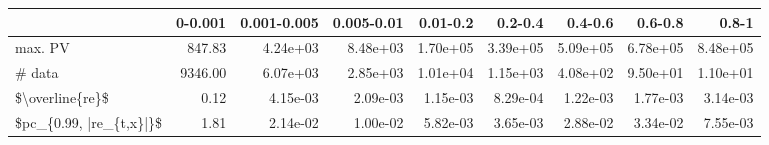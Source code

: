 \begin{tabular}{lrrrrrrrr}
\toprule
{} &  0-0.001 &  0.001-0.005 &  0.005-0.01 &  0.01-0.2 &   0.2-0.4 &   0.4-0.6 &   0.6-0.8 &     0.8-1 \\
\midrule
max. PV                 &   847.83 &     4.24e+03 &    8.48e+03 &  1.70e+05 &  3.39e+05 &  5.09e+05 &  6.78e+05 &  8.48e+05 \\
\# data                  &  9346.00 &     6.07e+03 &    2.85e+03 &  1.01e+04 &  1.15e+03 &  4.08e+02 &  9.50e+01 &  1.10e+01 \\
\$\textbackslash overline\{re\}\$         &     0.12 &     4.15e-03 &    2.09e-03 &  1.15e-03 &  8.29e-04 &  1.22e-03 &  1.77e-03 &  3.14e-03 \\
\$pc\_\{0.99, |re\_\{t,x\}|\}\$ &     1.81 &     2.14e-02 &    1.00e-02 &  5.82e-03 &  3.65e-03 &  2.88e-02 &  3.34e-02 &  7.55e-03 \\
\bottomrule
\end{tabular}

